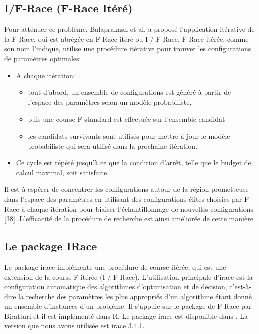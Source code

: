 \documentclass[12pt]{article}
\begin{document}
        \subsection{I/F-Race (F-Race Itéré)} 
            Pour atténuer ce problème, Balaprakash et al. \cite{balaprakash2007improvement} a proposé l'application itérative de la F-Race, qui est abrégée en F-Race itéré ou I / F-Race.
            F-Race itérée, comme son nom l'indique, utilise une procédure itérative pour trouver les configurations de paramètres optimales:
            \begin{itemize}
                \item A chaque itération:
                    \begin{itemize}
                        \item tout d'abord, un ensemble de configurations est généré à partir de l’espace des paramètres selon un modèle probabiliste,
                        \item puis une course F standard est effectuée sur l'ensemble candidat 
                        \item les candidats survivants sont utilisés pour mettre à jour le modèle probabiliste qui sera utilisé dans la prochaine itération.
                    \end{itemize}
                \item Ce cycle est répété jusqu'à ce que la condition d'arrêt, telle que le budget de calcul maximal, soit satisfaite.
            \end{itemize}
            Il est à espérer de concentrer les configurations autour de la région prometteuse dans l’espace des paramètres en utilisant des configurations élites choisies par F-Race à chaque itération pour biaiser l'échantillonnage de nouvelles configurations [38].  L'efficacité de la procédure de recherche est ainsi améliorée de cette manière.
        \subsection{Le package IRace}
        Le package irace implémente une procédure de course itérée, qui est une extension de la course F itérée (I / F-Race). L'utilisation principale d'irace est la configuration automatique des algorithmes d'optimisation et de décision, c'est-à-dire la recherche des paramètres les plus appropriés d'un algorithme étant donné un ensemble d’instances d'un problème. Il s'appuie sur le package de F-Race par Birattari et il est implémenté dans R. Le package irace est disponible dans \cite{lopez2016irace}.
        La version que nous avons utilisée est irace 3.4.1.
\end{document}

